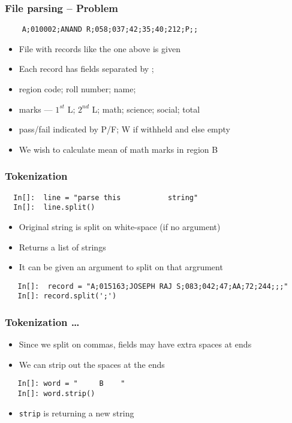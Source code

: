 \begin{frame}[fragile]
  \frametitle{File parsing -- Problem}
  \begin{lstlisting}
    A;010002;ANAND R;058;037;42;35;40;212;P;;
  \end{lstlisting}
  \begin{itemize}
  \item File with records like the one above is given
  \item Each record has fields separated by ;
  \item region code; roll number; name; 
  \item marks --- $1^{st}$ L; $2^{nd}$ L; math; science; social; total
  \item pass/fail indicated by P/F; W if withheld and else empty
    \end{itemize}

  \begin{itemize}
  \item We wish to calculate mean of math marks in region B
  \end{itemize}
\end{frame}

\begin{frame}[fragile]
  \frametitle{Tokenization}
  \begin{lstlisting}
  In[]:  line = "parse this           string"
  In[]:  line.split()
  \end{lstlisting}
  \begin{itemize}
  \item Original string is split on white-space (if no argument)
  \item Returns a list of strings
  \item It can be given an argument to split on that argrument
  \end{itemize}
  \begin{lstlisting}
   In[]:  record = "A;015163;JOSEPH RAJ S;083;042;47;AA;72;244;;;"
   In[]: record.split(';')
  \end{lstlisting}
\end{frame}

\begin{frame}[fragile]
  \frametitle{Tokenization \ldots}
  \begin{itemize}
  \item Since we split on commas, fields may have extra spaces at ends
  \item We can strip out the spaces at the ends
  \end{itemize}
  \begin{lstlisting}
   In[]: word = "     B    "
   In[]: word.strip()
  \end{lstlisting}
  \begin{itemize}
  \item \texttt{strip} is returning a new string 
  \end{itemize}
\end{frame}

